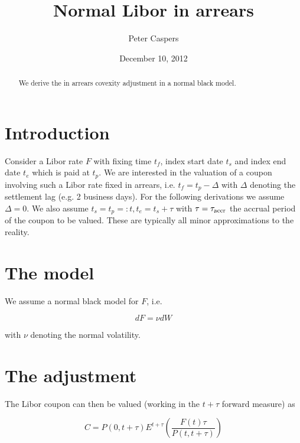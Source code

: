 \documentclass{amsart}
\theoremstyle{plain}
\numberwithin{equation}{section}
\begin{document}
\title[Normal Libor in arrears]{Normal Libor in arrears}
\author{Peter Caspers}
\date{December 10, 2012}
\begin{abstract}
We derive the in arrears covexity adjustment in a normal black model.
\end{abstract}

\maketitle

\section{Introduction}

Consider a Libor rate $F$ with fixing time $t_f$, index start date $t_s$ and index end date $t_e$ which is paid at $t_p$. We are interested in the valuation of a coupon involving such a Libor rate fixed in arrears, i.e. $t_f = t_p - \Delta$ with $\Delta$ denoting the settlement lag (e.g. 2 business days). For the following derivations we assume $\Delta=0$. We also assume $t_s = t_p =:t, t_e = t_s + \tau$ with $\tau=\tau_{\textnormal{accr}}$ the accrual period of the coupon to be valued. These are typically all minor approximations to the reality.

\section{The model}

We assume a normal black model for $F$, i.e.

\begin{equation}
dF = \nu dW
\end{equation}

with $\nu$ denoting the normal volatility. 

\section{The adjustment}

The Libor coupon can then be valued (working in the $t+\tau$ forward measure) as 

\begin{equation}\label{generaladjustment}
C = P(0,t+\tau) E^{t+\tau} \left( \frac{F(t)\tau }{P(t,t+\tau)} \right) 
\end{equation}
\end{document}
